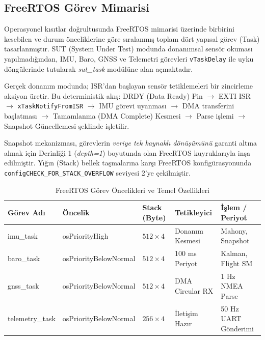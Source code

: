 \subsection{FreeRTOS Görev Mimarisi}
\label{freertos_gorev_mimarisi}

Operasyonel kısıtlar doğrultusunda FreeRTOS mimarisi üzerinde birbirini kesebilen ve durum önceliklerine göre sıralanmış toplam dört yapısal görev (Task) tasarlanmıştır. SUT (System Under Test) modunda donanımsal sensör okuması yapılmadığından, IMU, Baro, GNSS ve Telemetri görevleri \verb|vTaskDelay| ile uyku döngülerinde tutularak \textit{sut\_task} modülüne alan açmaktadır.

Gerçek donanım modunda; ISR'dan başlayan sensör tetiklemeleri bir zincirleme aksiyon üretir. Bu deterministik akış: DRDY (Data Ready) Pin $\rightarrow$ EXTI ISR $\rightarrow$ \verb|xTaskNotifyFromISR| $\rightarrow$ IMU görevi uyanması $\rightarrow$ DMA transferini başlatması $\rightarrow$ Tamamlanma (DMA Complete) Kesmesi $\rightarrow$ Parse işlemi $\rightarrow$ Snapshot Güncellemesi şeklinde işletilir.

Snapshot mekanizması, görevlerin \textit{veriye tek kaynaklı dönüşümünü} garanti altına almak için Derinliği 1 (\textit{depth=1}) boyutunda olan FreeRTOS kuyruklarıyla inşa edilmiştir. Yığın (Stack) bellek taşmalarına karşı FreeRTOS konfigürasyonunda \verb|configCHECK_FOR_STACK_OVERFLOW| seviyesi 2'ye çekilmiştir.

\begin{table}[htbp]
    \centering
    \caption{FreeRTOS Görev Öncelikleri ve Temel Özellikleri}
    \label{tab:gorev_tablosu}
    \begin{tabular}{|l|l|p{1.5cm}|p{3.5cm}|p{3cm}|}
    \hline
    \textbf{Görev Adı} & \textbf{Öncelik} & \textbf{Stack (Byte)} & \textbf{Tetikleyici} & \textbf{İşlem / Periyot} \\ \hline
    imu\_task & osPriorityHigh & $512 \times 4$ & Donanım Kesmesi & Mahony, Snapshot \\ \hline
    baro\_task & osPriorityBelowNormal & $512 \times 4$ & 100 ms Periyot & Kalman, Flight SM \\ \hline
    gnss\_task & osPriorityBelowNormal & $512 \times 4$ & DMA Circular RX & 1 Hz NMEA Parse \\ \hline
    telemetry\_task & osPriorityBelowNormal & $256 \times 4$ & İletişim Hazır & 50 Hz UART Gönderimi \\ \hline
    \end{tabular}
\end{table}

